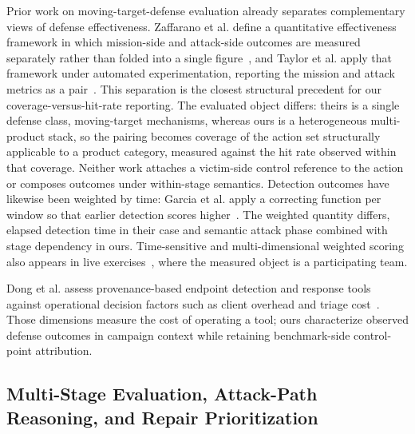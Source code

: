 Prior work on moving-target-defense evaluation already separates complementary views of defense effectiveness. Zaffarano et al. define a quantitative effectiveness framework in which mission-side and attack-side outcomes are measured separately rather than folded into a single figure~\cite{zaffarano2015mtd}, and Taylor et al. apply that framework under automated experimentation, reporting the mission and attack metrics as a pair~\cite{taylor2016mtd}. This separation is the closest structural precedent for our coverage-versus-hit-rate reporting. The evaluated object differs: theirs is a single defense class, moving-target mechanisms, whereas ours is a heterogeneous multi-product stack, so the pairing becomes coverage of the action set structurally applicable to a product category, measured against the hit rate observed within that coverage. Neither work attaches a victim-side control reference to the action or composes outcomes under within-stage semantics. Detection outcomes have likewise been weighted by time: Garcia et al. apply a correcting function per window so that earlier detection scores higher~\cite{garcia2014botnet}. The weighted quantity differs, elapsed detection time in their case and semantic attack phase combined with stage dependency in ours. Time-sensitive and multi-dimensional weighted scoring also appears in live exercises~\cite{doupe2011hitem,werther2011ctf}, where the measured object is a participating team.

Dong et al. assess provenance-based endpoint detection and response tools against operational decision factors such as client overhead and triage cost~\cite{dong2023arewethereyet}. Those dimensions measure the cost of operating a tool; ours characterize observed defense outcomes in campaign context while retaining benchmark-side control-point attribution.

\subsection{Multi-Stage Evaluation, Attack-Path Reasoning, and Repair Prioritization}
\label{subsec:rw-multistage-repair}

